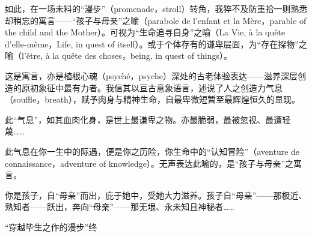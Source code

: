 如此，在一场未料的“漫步”（promenade，stroll）转角，我猝不及防重拾一则熟悉却稍忘的寓言——“孩子与母亲”之喻（parabole de l'enfant et la Mère，parable of the child and the Mother）。可视为“生命追寻自身”之喻（La Vie, à la quête d'elle-même，Life, in quest of itself）。或于个体存有的谦卑层面，为“存在探物”之喻（l'être, à la quête des choses，being, in quest of things）。

这是寓言，亦是植根心魂（psyché，psyche）深处的古老体验表达——滋养深层创造的原初象征中最有力者。我信其以亘古意象语言，述说了人之创造力气息（souffle，breath），赋予肉身与精神生命，自最卑微短暂至最辉煌恒久的显现。

此“气息”，如其血肉化身，是世上最谦卑之物。亦最脆弱，最被忽视、最遭轻蔑……

此气息在你一生中的际遇，便是你之历险，你生命中的“认知冒险”（aventure de connaissance，adventure of knowledge）。无声表达此喻的，是“孩子与母亲”之寓言。

你是孩子，自“母亲”而出，庇于她中，受她大力滋养。孩子自“母亲”——那极近、熟知者——跃出，奔向“母亲”——那无垠、永未知且神秘者……

\hfill “穿越毕生之作的漫步”终

